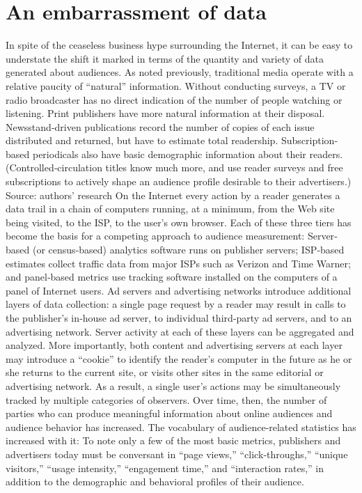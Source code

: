 \section{An embarrassment of data}
In spite of the ceaseless business hype surrounding the Internet, it can be
easy to understate the shift it marked in terms of the quantity and variety
of data generated about audiences. As noted previously, traditional media
operate with a relative paucity of ``natural'' information. Without
conducting surveys, a TV or radio broadcaster has no direct indication of
the number of people watching or listening.
Print publishers have more natural information at their disposal.
Newsstand‐driven publications record the number of copies of each issue
distributed and returned, but have to estimate total readership.
Subscription‐based periodicals also have basic demographic information
about their readers. (Controlled‐circulation titles know much more, and
use reader surveys and free subscriptions to actively shape an audience
profile desirable to their advertisers.)
Source: authors’ research
On the Internet every action by a reader generates a data trail in a chain of
computers running, at a minimum, from the Web site being visited, to the
ISP, to the user’s own browser. Each of these three tiers has become the
basis for a competing approach to audience measurement: Server‐based
(or census‐based) analytics software runs on publisher servers; ISP‐based
estimates collect traffic data from major ISPs such as Verizon and Time
Warner; and panel‐based metrics use tracking software installed on the
computers of a panel of Internet users.
Ad servers and advertising networks introduce additional layers of data
collection: a single page request by a reader may result in calls to the
publisher’s in‐house ad server, to individual third‐party ad servers, and to
an advertising network. Server activity at each of these layers can be
aggregated and analyzed. More importantly, both content and advertising
servers at each layer may introduce a ``cookie'' to identify the reader’s
computer in the future as he or she returns to the current site, or visits
other sites in the same editorial or advertising network. As a result, a
single user’s actions may be simultaneously tracked by multiple categories
of observers.
Over time, then, the number of parties who can produce meaningful
information about online audiences and audience behavior has increased.
The vocabulary of audience‐related statistics has increased with it: To note
only a few of the most basic metrics, publishers and advertisers today
must be conversant in ``page views,'' ``click‐throughs,'' ``unique visitors,''
``usage intensity,'' ``engagement time,'' and ``interaction rates,'' in addition
to the demographic and behavioral profiles of their audience.
